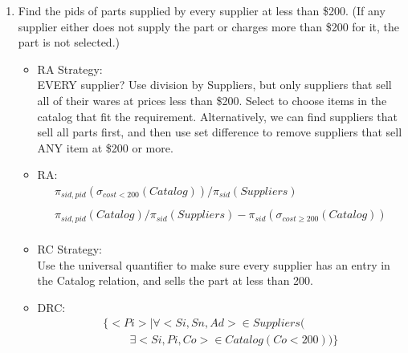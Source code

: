 \documentclass[12pt]{article}
\begin{document}
\begin{enumerate}
	\item Find the pids of parts supplied by every supplier at less than \$200. (If any supplier either does not supply the part or charges more than \$200 for it, the part is not selected.)
	
\begin{itemize}
\item RA Strategy: \\
EVERY supplier? Use division by Suppliers, but only suppliers that sell all of their wares at prices less than \$200. Select to choose items in the catalog that fit the requirement. Alternatively, we can find suppliers that sell all parts first, and then use set difference to remove suppliers that sell ANY item at \$200 or more.  
\item RA: \\
\begin{multline*}
\pi_{sid,pid}(\sigma_{cost<200}(Catalog))/\pi_{sid}(Suppliers)\\
\\
\pi_{sid,pid}(Catalog)/\pi_{sid}(Suppliers) - \pi_{sid}(\sigma_{cost \geq 200}(Catalog))\\
\end{multline*}
\item RC Strategy: \\
Use the universal quantifier to make sure every supplier has an entry in the Catalog relation, and sells the part at less than 200.
\item DRC:
\begin{multline*}
\{<Pi>|\forall <Si,Sn,Ad> \in Suppliers( \\
	\hspace{1cm}\exists <Si,Pi,Co> \in Catalog(Co < 200))\} \\
\end{multline*}
\end{itemize}	

\end{enumerate}
\end{document}
